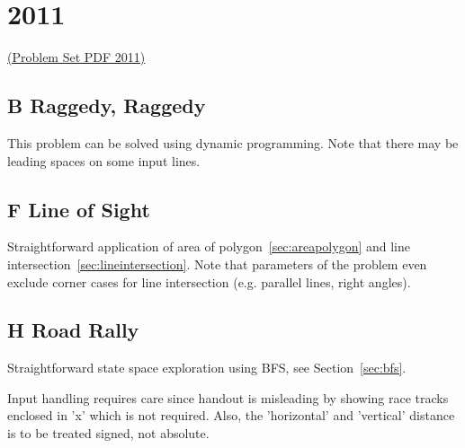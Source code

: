 
\section{2011}

\href{http://midatl.radford.edu/docs/pastProblems/11contest/MidAtlantic2011.pdf}{(Problem Set PDF 2011)}

\subsection{B Raggedy, Raggedy}
\label{sec:2011-b-raggedy}

This problem can be solved using dynamic programming.
Note that there may be leading spaces on some input lines.

\subsection{F Line of Sight}
\label{sec:2011-f-lineofsight}

Straightforward application of area of polygon~\ref{sec:areapolygon} and line intersection~\ref{sec:lineintersection}.
Note that parameters of the problem even exclude corner cases for line intersection (e.g. parallel lines, right angles).

\subsection{H Road Rally}
\label{sec:2011-h-rally}

Straightforward state space exploration using BFS, see Section~\ref{sec:bfs}.

Input handling requires care since handout is misleading by showing race tracks enclosed in 'x' which is not
required.  Also, the 'horizontal' and 'vertical' distance is to be treated signed, not absolute.

